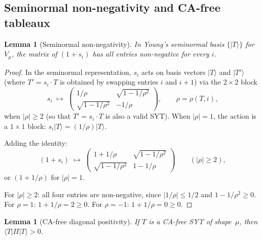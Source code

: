 \documentclass[11pt]{article}
\newtheorem{lemma}[theorem]{Lemma}
\theoremstyle{definition}
\theoremstyle{remark}
\begin{document}
\subsection{Seminormal non-negativity and CA-free tableaux}

\begin{lemma}[Seminormal non-negativity]\label{lem:seminorm}
In Young's seminormal basis $\{|T\rangle\}$ for~$V_\mu$, the matrix of
$(1+s_i)$ has all entries non-negative for every $i$.
\end{lemma}

\begin{proof}
In the seminormal representation, $s_i$ acts on basis vectors
$|T\rangle$ and $|T'\rangle$ (where $T' = s_i \cdot T$ is obtained
by swapping entries $i$ and $i+1$) via the $2\times 2$ block
\[
  s_i \;\mapsto\;
  \begin{pmatrix}
    1/\rho & \sqrt{1 - 1/\rho^2} \\
    \sqrt{1 - 1/\rho^2} & -1/\rho
  \end{pmatrix},
  \qquad \rho = \rho(T,i),
\]
when $|\rho| \ge 2$ (so that $T' = s_i \cdot T$ is also a valid SYT).
When $|\rho| = 1$, the action is a $1\times 1$ block:
$s_i|T\rangle = (1/\rho)|T\rangle$.

Adding the identity:
\[
  (1+s_i) \;\mapsto\;
  \begin{pmatrix}
    1+1/\rho & \sqrt{1 - 1/\rho^2} \\
    \sqrt{1 - 1/\rho^2} & 1-1/\rho
  \end{pmatrix}
  \qquad (|\rho| \ge 2),
\]
or $(1+1/\rho)$ for $|\rho| = 1$.

For $|\rho| \ge 2$: all four entries are non-negative, since
$|1/\rho| \le 1/2$ and $1 - 1/\rho^2 \ge 0$.
For $\rho = 1$: $1+1/\rho = 2 \ge 0$.
For $\rho = -1$: $1+1/\rho = 0 \ge 0$.
\end{proof}

\begin{lemma}[CA-free diagonal positivity]\label{lem:cafree-diag}
If $T$ is a CA-free SYT of shape~$\mu$, then
$\langle T|\Pi|T\rangle > 0$.
\end{lemma}
\end{document}
